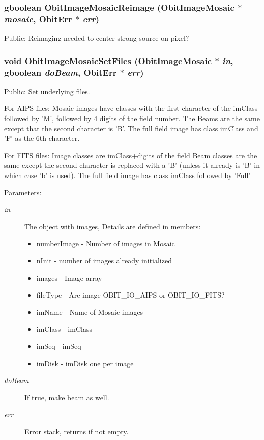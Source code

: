 \subsubsection{\setlength{\rightskip}{0pt plus 5cm}gboolean Obit\-Image\-Mosaic\-Reimage ({\bf Obit\-Image\-Mosaic} $\ast$ {\em mosaic}, {\bf Obit\-Err} $\ast$ {\em err})}\label{ObitImageMosaic_8h_a22}


Public: Reimaging needed to center strong source on pixel? 

\subsubsection{\setlength{\rightskip}{0pt plus 5cm}void Obit\-Image\-Mosaic\-Set\-Files ({\bf Obit\-Image\-Mosaic} $\ast$ {\em in}, gboolean {\em do\-Beam}, {\bf Obit\-Err} $\ast$ {\em err})}\label{ObitImageMosaic_8h_a16}


Public: Set underlying files. 

For AIPS files: Mosaic images have classes with the first character of the im\-Class followed by 'M', followed by 4 digits of the field number. The Beams are the same except that the second character is 'B'. The full field image has class im\-Class and 'F' as the 6th character.

For FITS files: Image classes are im\-Class+digits of the field Beam classes are the same except the second character is replaced with a 'B' (unless it already is 'B' in which case 'b' is used). The full field image has class im\-Class followed by 'Full'

\begin{Desc}
\item[Parameters:]
\begin{description}
\item[{\em in}]The object with images, Details are defined in members: \begin{itemize}
\item number\-Image - Number of images in Mosaic \item n\-Init - number of images already initialized \item images - Image array \item file\-Type - Are image OBIT\_\-IO\_\-AIPS or OBIT\_\-IO\_\-FITS? \item im\-Name - Name of Mosaic images \item im\-Class - im\-Class \item im\-Seq - im\-Seq \item im\-Disk - im\-Disk one per image \end{itemize}
\item[{\em do\-Beam}]If true, make beam as well. \item[{\em err}]Error stack, returns if not empty. \end{description}
\end{Desc}
